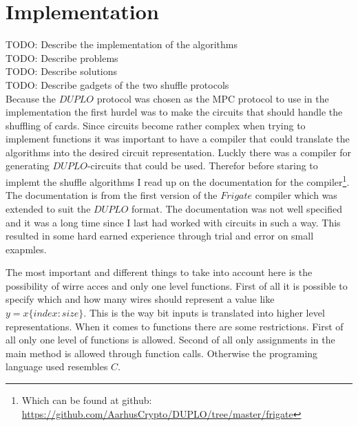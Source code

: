 \documentclass[twoside,11pt,openright]{report}
\newcommand{\todo}[1]{}
\renewcommand{\todo}[1]{{\color{red} TODO: {#1}} \\}
\begin{document}
\section{Implementation}
\label{sec:cir_imp}

\todo{Describe the implementation of the algorithms}
\todo{Describe problems}
\todo{Describe solutions}
\todo{Describe gadgets of the two shuffle protocols}

Because the $DUPLO$ protocol was chosen as the MPC protocol to use in the implementation the first hurdel was to make the circuits that should handle the shuffling of cards. Since circuits become rather complex when trying to implement functions it was important to have a compiler that could translate the algorithms into the desired circuit representation. Luckly there was a compiler for generating $DUPLO$-circuits that could be used. Therefor before staring to implemt the shuffle algorithms I read up on the documentation for the compiler\footnote{Which can be found at github: \url{https://github.com/AarhusCrypto/DUPLO/tree/master/frigate}}. The documentation is from the first version of the $Frigate$ compiler which was extended to suit the $DUPLO$ format. The documentation was not well specified and it was a long time since I last had worked with circuits in such a way. This resulted in some hard earned experience through trial and error on small exapmles.

The most important and different things to take into account here is the possibility of wirre acces and only one level functions. First of all it is possible to specify which and how many wires should represent a value like $y=x\{index:size\}$. This is the way bit inputs is translated into higher level representations. When it comes to functions there are some restrictions. First of all only one level of functions is allowed. Second of all only assignments in the main method is allowed through function calls. Otherwise the programing language used resembles $C$.

\bigskip
\end{document}
